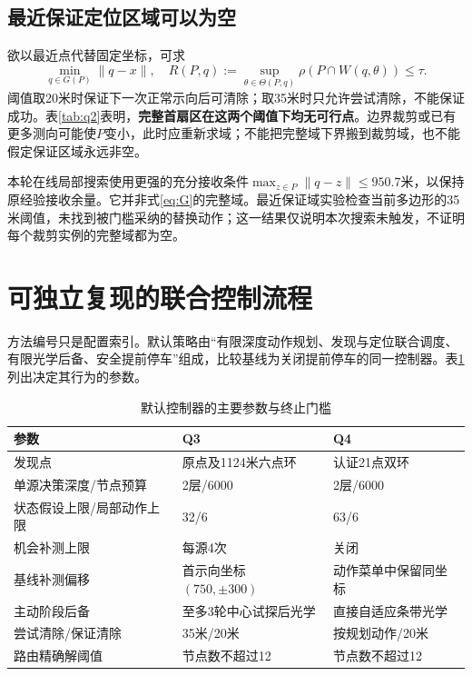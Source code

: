 \documentclass[UTF8,a4paper,zihao=-4,fontset=mac]{ctexart}
\begin{document}
\subsection{最近保证定位区域可以为空}
欲以最近点代替固定坐标，可求
\begin{equation}\label{eq:guarantee}
\min_{q\in G(P)}\|q-x\|,\quad R(P,q):=\sup_{\theta\in\Theta(P,q)}\rho(P\cap W(q,\theta))\le\tau.
\end{equation}
阈值取20米时保证下一次正常示向后可清除；取35米时只允许尝试清除，不能保证成功。表\ref{tab:q2}表明，\textbf{完整首扇区在这两个阈值下均无可行点}。边界裁剪或已有更多测向可能使$P$变小，此时应重新求域；不能把完整域下界搬到裁剪域，也不能假定保证区域永远非空。

本轮在线局部搜索使用更强的充分接收条件$\max_{z\in P}\|q-z\|\le950.7$米，以保持原经验接收余量。它并非式\eqref{eq:G}的完整域。最近保证域实验检查当前多边形的35米阈值，未找到被门槛采纳的替换动作；这一结果仅说明本次搜索未触发，不证明每个裁剪实例的完整域都为空。

\section{可独立复现的联合控制流程}
方法编号只是配置索引。默认策略由“有限深度动作规划、发现与定位联合调度、有限光学后备、安全提前停车”组成，比较基线为关闭提前停车的同一控制器。表\ref{tab:parameters}列出决定其行为的参数。
\begin{table}[H]\centering\small\caption{默认控制器的主要参数与终止门槛}\label{tab:parameters}
\begin{tabular}{p{5cm}p{4.6cm}p{4.6cm}}\toprule 参数&Q3&Q4\\\midrule
发现点&原点及1124米六点环&认证21点双环\\
单源决策深度/节点预算&2层/6000&2层/6000\\
状态假设上限/局部动作上限&32/6&63/6\\
机会补测上限&每源4次&关闭\\
基线补测偏移&首示向坐标$(750,\pm300)$&动作菜单中保留同坐标\\
主动阶段后备&至多3轮中心试探后光学&直接自适应条带光学\\
尝试清除/保证清除&35米/20米&按规划动作/20米\\
路由精确解阈值&节点数不超过12&节点数不超过12\\\bottomrule\end{tabular}\end{table}
\end{document}
